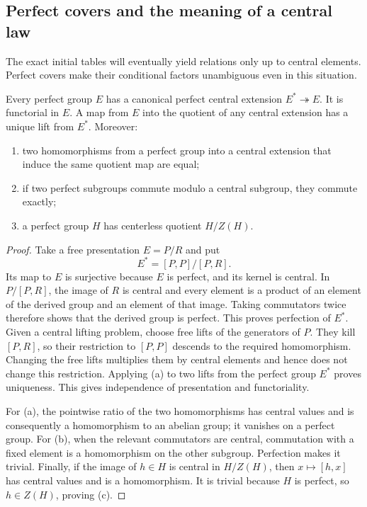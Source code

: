\subsection{Perfect covers and the meaning of a central law}

The exact initial tables will eventually yield relations only up to
central elements.  Perfect covers make their conditional factors
unambiguous even in this situation.

\begin{lemma}\label{lem:perfect-covers}
Every perfect group $E$ has a canonical perfect central extension
$E^\ast\twoheadrightarrow E$.  It is functorial in $E$.  A map from
$E$ into the quotient of any central extension has a unique lift from
$E^\ast$.  Moreover:
\begin{enumerate}[label=(\alph*)]
\item two homomorphisms from a perfect group into a central extension
      that induce the same quotient map are equal;
\item if two perfect subgroups commute modulo a central subgroup,
      they commute exactly;
\item a perfect group $H$ has centerless quotient $H/Z(H)$.
\end{enumerate}
\end{lemma}

\begin{proof}
Take a free presentation $E=P/R$ and put
\[
 E^\ast=[P,P]/[P,R].
\]
Its map to $E$ is surjective because $E$ is perfect, and its kernel
is central.  In $P/[P,R]$, the image of $R$ is central and every
element is a product of an element of the derived group and an
element of that image.  Taking commutators twice therefore shows
that the derived group is perfect.  This proves perfection of
$E^\ast$.  Given a central lifting problem, choose free lifts of
the generators of $P$.  They kill $[P,R]$, so their restriction to
$[P,P]$ descends to the required homomorphism.  Changing the free
lifts multiplies them by central elements and hence does not change
this restriction.  Applying (a) to two lifts from the perfect group
$E^\ast$ proves uniqueness.  This gives independence of presentation
and functoriality.

For (a), the pointwise ratio of the two homomorphisms has central
values and is consequently a homomorphism to an abelian group; it
vanishes on a perfect group.  For (b), when the relevant commutators
are central, commutation with a fixed element is a homomorphism on
the other subgroup.  Perfection makes it trivial.  Finally, if the
image of $h\in H$ is central in $H/Z(H)$, then
$x\mapsto[h,x]$ has central values and is a homomorphism.  It is
trivial because $H$ is perfect, so $h\in Z(H)$, proving (c).
\end{proof}

